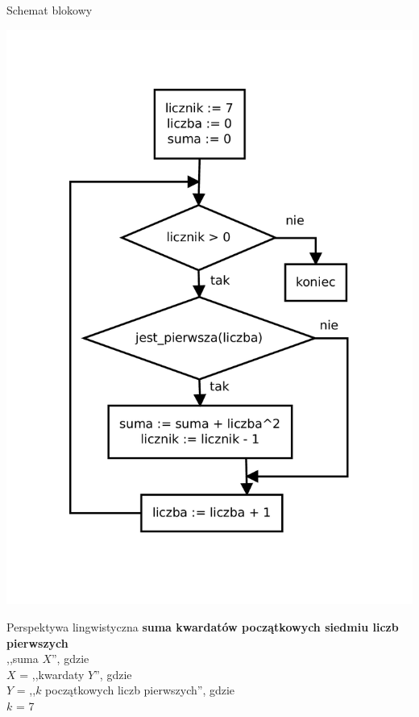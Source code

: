 \documentclass{beamer}
\begin{document}
\begin{frame}{Schemat blokowy}
  \begin{center}
    \includegraphics[width=\textwidth,height=0.8\textheight,keepaspectratio]{pierwsze.pdf}
  \end{center}
\end{frame}

\begin{frame}{Perspektywa lingwistyczna}
  \textbf{suma kwardatów początkowych siedmiu liczb pierwszych} \\
  \pause
  ,,suma $X$''\pause, gdzie \\
  $X$ = ,,kwardaty $Y$''\pause, gdzie \\
  $Y$ = ,,$k$ początkowych liczb pierwszych''\pause, gdzie \\
  $k$ = 7
\end{frame}
\end{document}
